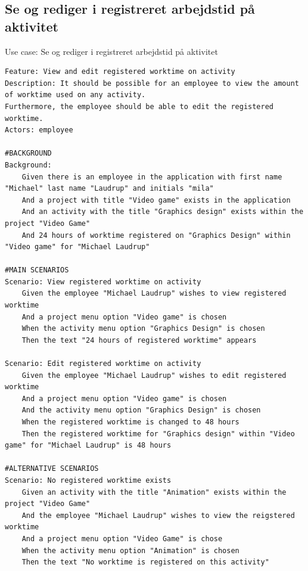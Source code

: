 \subsection{Se og rediger i registreret arbejdstid på aktivitet}
\begin{listing}[H]
    \centering
    \caption{Use case: Se og rediger i registreret arbejdstid på aktivitet}\label{lst:usecase_se_og_rediger_i_registreret_arbejdstid_paa_aktivitet}
    \begin{verbatim}  
Feature: View and edit registered worktime on activity
Description: It should be possible for an employee to view the amount of worktime used on any activity.
Furthermore, the employee should be able to edit the registered worktime. 
Actors: employee

#BACKGROUND
Background:
    Given there is an employee in the application with first name "Michael" last name "Laudrup" and initials "mila"
    And a project with title "Video game" exists in the application
    And an activity with the title "Graphics design" exists within the project "Video Game"
    And 24 hours of worktime registered on "Graphics Design" within "Video game" for "Michael Laudrup"

#MAIN SCENARIOS
Scenario: View registered worktime on activity
    Given the employee "Michael Laudrup" wishes to view registered worktime
    And a project menu option "Video game" is chosen
    When the activity menu option "Graphics Design" is chosen
    Then the text "24 hours of registered worktime" appears

Scenario: Edit registered worktime on activity
    Given the employee "Michael Laudrup" wishes to edit registered worktime
    And a project menu option "Video game" is chosen
    And the activity menu option "Graphics Design" is chosen
    When the registered worktime is changed to 48 hours
    Then the registered worktime for "Graphics design" within "Video game" for "Michael Laudrup" is 48 hours

#ALTERNATIVE SCENARIOS
Scenario: No registered worktime exists
    Given an activity with the title "Animation" exists within the project "Video Game"
    And the employee "Michael Laudrup" wishes to view the reigstered worktime
    And a project menu option "Video Game" is chose
    When the activity menu option "Animation" is chosen
    Then the text "No worktime is registered on this activity"

    \end{verbatim}
\end{listing}

